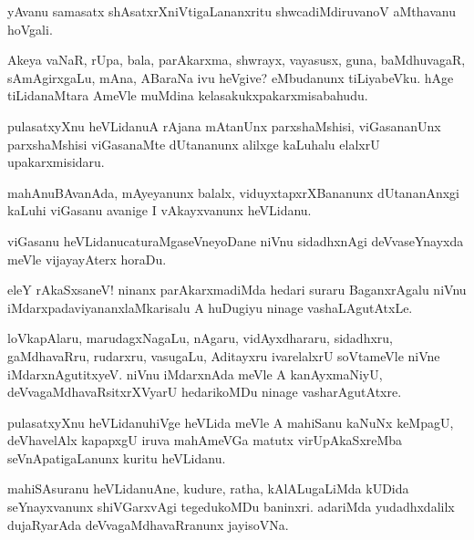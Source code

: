 \begin{mng}
yAvanu samasatx shAsatxrXniVtigaLananxritu shwcadiMdiruvanoV aMthavanu hoVgali.
\end{mng}

\begin{mng}
Akeya vaNaR, rUpa, bala, parAkarxma, shwrayx, vayasusx, guna, baMdhuvagaR, sAmAgirxgaLu, mAna, ABaraNa ivu heVgive? eMbudanunx tiLiyabeVku. hAge tiLidanaMtara AmeVle muMdina kelasakukxpakarxmisabahudu.
\end{mng}

\begin{mng}
pulasatxyXnu heVLidanu\mdash A rAjana mAtanUnx parxshaMshisi, viGasananUnx parxshaMshisi viGasanaMte dUtananunx alilxge kaLuhalu elalxrU upakarxmisidaru.
\end{mng}

\begin{mng}
mahAnuBAvanAda, mAyeyanunx balalx, viduyxtapxrXBananunx dUtananAnxgi kaLuhi viGasanu avanige I vAkayxvanunx heVLidanu.
\end{mng}

\begin{mng}
viGasanu heVLidanu\mdash caturaMgaseVneyoDane niVnu sidadhxnAgi deVvaseYnayxda meVle vijayayAterx horaDu.
\end{mng}

\begin{mng}
eleY rAkaSxsaneV! ninanx parAkarxmadiMda hedari suraru BaganxrAgalu niVnu iMdarxpadaviyananxlaMkarisalu A huDugiyu ninage vashaLAgutAtxLe.
\end{mng}

\begin{mng}
loVkapAlaru, marudagxNagaLu, nAgaru, vidAyxdhararu, sidadhxru, gaMdhavaRru, rudarxru, vasugaLu, Aditayxru ivarelalxrU soVtameVle niVne iMdarxnAgutitxyeV. niVnu iMdarxnAda meVle A kanAyxmaNiyU, deVvagaMdhavaRsitxrXVyarU hedarikoMDu ninage vasharAgutAtxre.
\end{mng}

\begin{mng}
pulasatxyXnu heVLidanu\mdash hiVge heVLida meVle A mahiSanu kaNuNx keMpagU, deVhavelAlx kapapxgU iruva mahAmeVGa matutx virUpAkaSxreMba seVnApatigaLanunx kuritu heVLidanu.
\end{mng}

\begin{mng}
mahiSAsuranu heVLidanu\mdash Ane, kudure, ratha, kAlALugaLiMda kUDida seYnayxvanunx shiVGarxvAgi tegedukoMDu baninxri. adariMda yudadhxdalilx dujaRyarAda deVvagaMdhavaRranunx jayisoVNa.
\end{mng}

